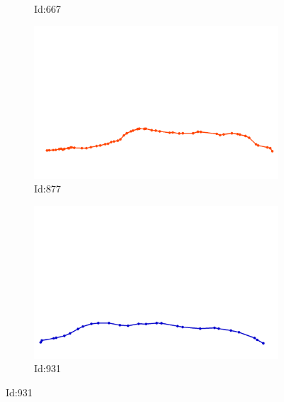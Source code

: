 \documentclass[12pt,twoside]{report}
\begin{document}
\begin{figure}
\begin{subfigure}[b]{0.20\textwidth}
\caption{Id:667}
\end{subfigure}
\begin{subfigure}[b]{0.20\textwidth}
\centering
\includegraphics[width=\textwidth]{../../trajectories/877.png}
\caption{Id:877}
\end{subfigure}
\begin{subfigure}[b]{0.20\textwidth}
\centering
\includegraphics[width=\textwidth]{../../trajectories/931.png}
\caption{Id:931}
\end{subfigure}
\end{figure}
\end{document}
